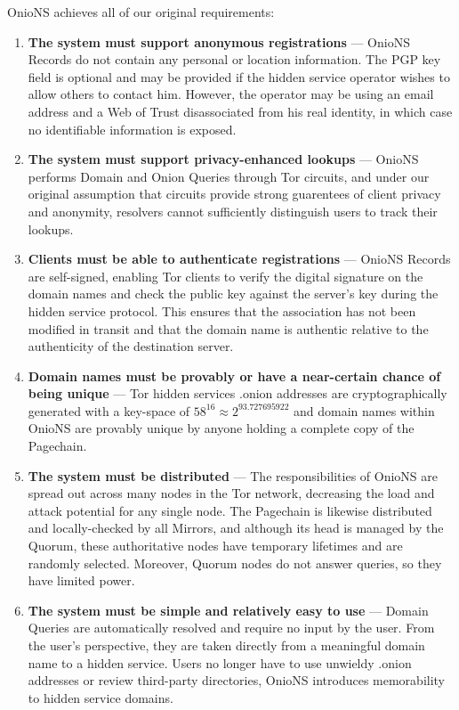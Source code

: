 OnioNS achieves all of our original requirements:

\begin{enumerate}
	\item \textbf{The system must support anonymous registrations} --- OnioNS Records do not contain any personal or location information. The PGP key field is optional and may be provided if the hidden service operator wishes to allow others to contact him. However, the operator may be using an email address and a Web of Trust disassociated from his real identity, in which case no identifiable information is exposed.
	\item \textbf{The system must support privacy-enhanced lookups} --- OnioNS performs Domain and Onion Queries through Tor circuits, and under our original assumption that circuits provide strong guarentees of client privacy and anonymity, resolvers cannot sufficiently distinguish users to track their lookups.
	\item \textbf{Clients must be able to authenticate registrations} --- OnioNS Records are self-signed, enabling Tor clients to verify the digital signature on the domain names and check the public key against the server's key during the hidden service protocol. This ensures that the association has not been modified in transit and that the domain name is authentic relative to the authenticity of the destination server.
	\item \textbf{Domain names must be provably or have a near-certain chance of being unique} --- Tor hidden services .onion addresses are cryptographically generated with a key-space of $ 58 ^ 16 \approx 2 ^ 93.727695922 $ and domain names within OnioNS are provably unique by anyone holding a complete copy of the Pagechain.
	\item \textbf{The system must be distributed} --- The responsibilities of OnioNS are spread out across many nodes in the Tor network, decreasing the load and attack potential for any single node. The Pagechain is likewise distributed and locally-checked by all Mirrors, and although its head is managed by the Quorum, these authoritative nodes have temporary lifetimes and are randomly selected. Moreover, Quorum nodes do not answer queries, so they have limited power.
	\item \textbf{The system must be simple and relatively easy to use} --- Domain Queries are automatically resolved and require no input by the user. From the user's perspective, they are taken directly from a meaningful domain name to a hidden service. Users no longer have to use unwieldy .onion addresses or review third-party directories, OnioNS introduces memorability to hidden service domains.

\end{enumerate}
